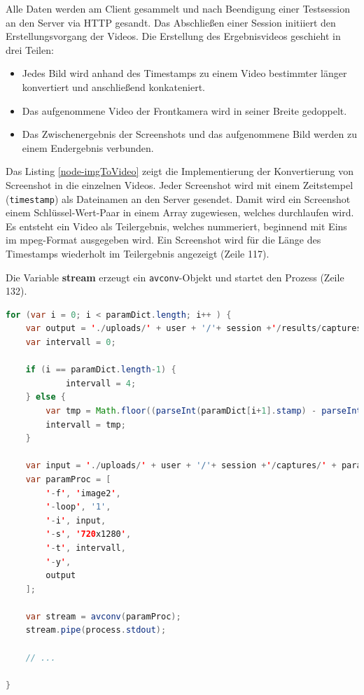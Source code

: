 Alle Daten werden am Client gesammelt und nach Beendigung einer Testsession an den Server via HTTP gesandt. 
Das Abschließen einer Session initiiert den Erstellungsvorgang der Videos. 
Die Erstellung des Ergebnisvideos geschieht in drei Teilen: 

\begin{itemize}
	\item{Jedes Bild wird anhand des Timestamps zu einem Video bestimmter länger konvertiert und anschließend konkateniert.}
	\item{Das aufgenommene Video der Frontkamera wird in seiner Breite gedoppelt.}
	\item{Das Zwischenergebnis der Screenshots und das aufgenommene Bild werden zu einem Endergebnis verbunden.}
\end{itemize}

Das Listing \ref{node-imgToVideo} zeigt die Implementierung der Konvertierung von Screenshot in die einzelnen Videos. 
Jeder Screenshot wird mit einem Zeitstempel (\texttt{timestamp}) als Dateinamen an den Server gesendet. 
Damit wird ein Screenshot einem Schlüssel-Wert-Paar in einem Array zugewiesen, welches durchlaufen wird. 
Es entsteht ein Video als Teilergebnis, welches nummeriert, beginnend mit Eins im mpeg-Format ausgegeben wird. 
Ein Screenshot wird für die Länge des Timestamps wiederholt im Teilergebnis angezeigt (Zeile 117).

Die Variable \textbf{stream} erzeugt ein \texttt{avconv}-Objekt und startet den Prozess (Zeile 132). 

\begin{lstlisting}[label=node-imgToVideo,language=Java, caption=Erstellung der Videos aus Screenshots, firstnumber=110]
for (var i = 0; i < paramDict.length; i++ ) {
	var output = './uploads/' + user + '/'+ session +'/results/captures/'+ (i+1)+'.mpg';
	var intervall = 0;
    
    if (i == paramDict.length-1) {
    		intervall = 4;
	} else {
		var tmp = Math.floor((parseInt(paramDict[i+1].stamp) - parseInt(paramDict[i].stamp)) / 1000);    
        intervall = tmp;
	}
	
	var input = './uploads/' + user + '/'+ session +'/captures/' + paramDict[i].filename;
	var paramProc = [
		'-f', 'image2',
		'-loop', '1',
		'-i', input,
		'-s', '720x1280',
		'-t', intervall,
		'-y',
		output
	];

	var stream = avconv(paramProc);
	stream.pipe(process.stdout);
	
	// ...
	
}
\end{lstlisting}

